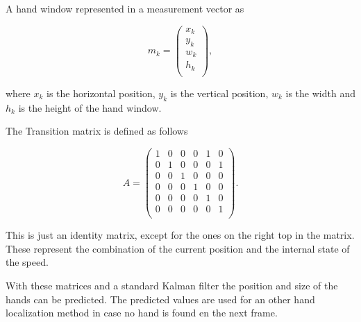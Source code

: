 A hand window represented in a measurement vector as

\begin{equation}
 m_k = \left(
\begin{array}{c}
	x_k \\ %
	y_k \\ %
	w_k \\ %
	h_k \\ %
\end{array} \right),
\end{equation}

where $x_k$ is the horizontal position, $y_k$ is the vertical position, $w_k$ is the width and $h_k$ is the height of the hand window.

The Transition matrix is defined as follows

\begin{equation}
 A = \left(
\begin{array}{cccccc}
	1 & 0 & 0 & 0 & 1 & 0 \\
	0 & 1 & 0 & 0 & 0 & 1 \\
	0 & 0 & 1 & 0 & 0 & 0 \\
	0 & 0 & 0 & 1 & 0 & 0 \\
	0 & 0 & 0 & 0 & 1 & 0 \\
	0 & 0 & 0 & 0 & 0 & 1 \\
\end{array} \right).
\end{equation}
	
This is just an identity matrix, except for the ones on the right top in the matrix. These represent the combination of the current position and the internal state of the speed.

With these matrices and a standard Kalman filter the position and size of the hands can be predicted. The predicted values are used for an other hand localization method in case no hand is found en the next frame.




% 

